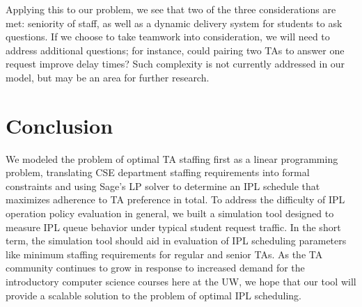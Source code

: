 \documentclass{article}
\begin{document}
\begin{multicols}{2}
Applying this to our problem, we see that two of the three considerations are met: seniority of staff, as well as a dynamic delivery system for students to ask questions. If we choose to take teamwork into consideration, we will need to address additional questions; for instance, could pairing two TAs to answer one request improve delay times? Such complexity is not currently addressed in our model, but may be an area for further research.

\section*{Conclusion}

We modeled the problem of optimal TA staffing first as a linear programming problem, translating CSE department staffing requirements into formal constraints and using Sage's LP solver to determine an IPL schedule that maximizes adherence to TA preference in total. To address the difficulty of IPL operation policy evaluation in general, we built a simulation tool designed to measure IPL queue behavior under typical student request traffic. In the short term, the simulation tool should aid in evaluation of IPL scheduling parameters like minimum staffing requirements for regular and senior TAs. As the TA community continues to grow in response to increased demand for the introductory computer science courses here at the UW, we hope that our tool will provide a scalable solution to the problem of optimal IPL scheduling.





\end{multicols}
\end{document}
